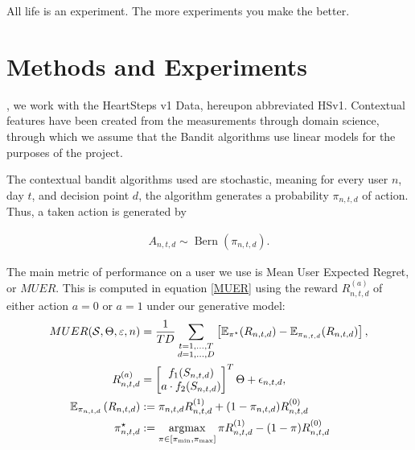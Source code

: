 \begin{savequote}[75mm]
All life is an experiment.  The more experiments you make the better.
\end{savequote}

\chapter{Methods and Experiments}
\label{Methods}

, we work with the HeartSteps v1 Data, hereupon abbreviated HSv1.  Contextual features have been created from the measurements through domain science, through which we assume that the Bandit algorithms use linear models for the purposes of the project.

The contextual bandit algorithms used are stochastic, meaning for every user $n$, day $t$, and decision point $d$, the algorithm generates a probability $\pi_{n,t,d}$ of action.  Thus, a taken action is generated by

\begin{align*}
A_{n,t,d} \sim \operatorname{Bern}(\pi_{n,t,d}).
\end{align*}

The main metric of performance on a user we use is Mean User Expected Regret, or $MUER$. This is computed in equation \ref{MUER} using the reward $R^{(a)}_{n,t,d}$ of either action $a = 0$ or $a = 1$ under our generative model:
\begin{align}
\label{MUER}
MUER(\mathcal{S}, \Theta, \varepsilon,n) &= \frac{1}{TD} \sum_{\substack{t=1,\ldots,T \\ d=1,\ldots,D}} \left[\mathbb{E}_{\pi^\star} (R_{n,t,d}) - \mathbb{E}_{\pi_{n,t,d}} (R_{n,t,d}) \right],  \\
\label{GenReward}
R^{(a)}_{n,t,d} &= \begin{bmatrix} f_1(S_{n,t,d}) \\
a \cdot f_2(S_{n,t,d})
\end{bmatrix}^T \Theta + \epsilon_{n,t,d},  \\
\label{ExpectedReward}
\mathbb{E}_{\pi_{n,t,d}}\left(R_{n,t,d}\right) &:= \pi_{n,t,d} R^{(1)}_{n,t,d} + (1-\pi_{n,t,d}) R^{(0)}_{n,t,d} \\
\label{OptProb}
\pi^{\star}_{n,t,d} &:= \argmax_{\pi \in [\pi_{\text{min}},\pi_\text{max}]} \pi R_{n,t,d}^{(1)} - (1 -\pi) R_{n,t,d}^{(0)}
\end{align}

